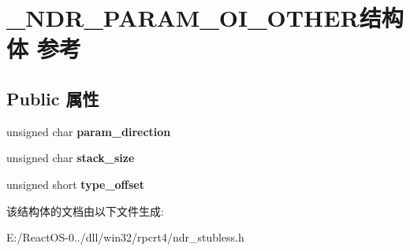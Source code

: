 \hypertarget{struct___n_d_r___p_a_r_a_m___o_i___o_t_h_e_r}{}\section{\+\_\+\+N\+D\+R\+\_\+\+P\+A\+R\+A\+M\+\_\+\+O\+I\+\_\+\+O\+T\+H\+E\+R结构体 参考}
\label{struct___n_d_r___p_a_r_a_m___o_i___o_t_h_e_r}
\subsection*{Public 属性}
\begin{DoxyCompactItemize}
\item 
\mbox{\label{struct___n_d_r___p_a_r_a_m___o_i___o_t_h_e_r_a13267f3d0cadfd3996494ba847ae69c5}} 
unsigned char {\bfseries param\+\_\+direction}
\item 
\mbox{\label{struct___n_d_r___p_a_r_a_m___o_i___o_t_h_e_r_a2df4c695c76c4eb75f235f97e6101498}} 
unsigned char {\bfseries stack\+\_\+size}
\item 
\mbox{\label{struct___n_d_r___p_a_r_a_m___o_i___o_t_h_e_r_a603605869c3377f4e45dba4663314e6a}} 
unsigned short {\bfseries type\+\_\+offset}
\end{DoxyCompactItemize}


该结构体的文档由以下文件生成\+:\begin{DoxyCompactItemize}
\item 
E\+:/\+React\+O\+S-\/0../dll/win32/rpcrt4/ndr\+\_\+stubless.\+h\end{DoxyCompactItemize}
